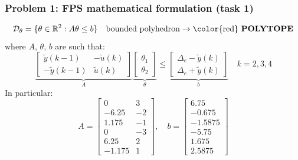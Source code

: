 \documentclass{beamer}
\begin{document}
\begin{frame}
    \frametitle{Problem 1: FPS mathematical formulation (task 1)}
    \begin{equation*}
        \mathcal{D}_\theta=\{
            \theta\in\mathbb{R}^2: A\theta\le{b} 
        \}\quad \text{bounded polyhedron} \to \text{\color{red} \textbf{POLYTOPE}}
    \end{equation*}
    where $A$, $\theta$, $b$ are such that:
    \begin{equation}\label{eq:ineq}
        \underbrace{\begin{bmatrix}
            \tilde{y}(k-1)&-\tilde{u}(k)\\
            -\tilde{y}(k-1)&\tilde{u}(k)
        \end{bmatrix}}_{A} \underbrace{\begin{bmatrix}
            \theta_1\\
            \theta_2
        \end{bmatrix}}_\theta \le \underbrace{\begin{bmatrix}
            \Delta_e-\tilde{y}(k)\\
            \Delta_e+\tilde{y}(k)
        \end{bmatrix}}_{b} \quad k=2,3,4
    \end{equation}
    In particular: 
    \begin{equation}\label{eq:data}
        A=\begin{bmatrix}
            0&3\\
            -6.25&-2\\
            1.175&-1\\
            0&-3\\
            6.25&2\\
            -1.175&1
        \end{bmatrix}, \quad
        b=\begin{bmatrix}
            6.75\\
            -0.675\\
            -1.5875\\
            -5.75\\
             1.675\\
             2.5875
        \end{bmatrix}
    \end{equation}
\end{frame}
\end{document}
